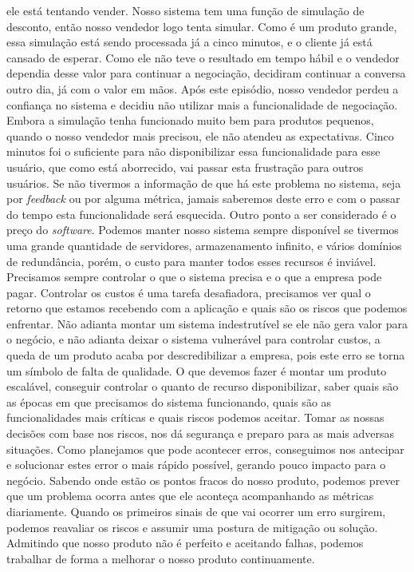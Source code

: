     ele está tentando vender. Nosso sistema tem uma função de simulação de desconto,
    então nosso vendedor logo tenta simular. Como é um produto grande, essa simulação
    está sendo processada já a cinco minutos, e o cliente já está cansado de esperar.
    Como ele não teve o resultado em tempo hábil e o vendedor dependia desse valor
    para continuar a negociação, decidiram continuar a conversa outro dia, já com
    o valor em mãos. Após este episódio, nosso vendedor perdeu a confiança no
    sistema e decidiu não utilizar mais a funcionalidade de negociação. Embora a
    simulação tenha funcionado muito bem para produtos pequenos, quando o nosso
    vendedor mais precisou, ele não atendeu as expectativas. Cinco minutos foi o
    suficiente para não disponibilizar essa funcionalidade para esse usuário, que
    como está aborrecido, vai passar esta frustração para outros usuários. Se não
    tivermos a informação de que há este problema no sistema, seja por \textit{feedback}
    ou por alguma métrica, jamais saberemos deste erro e com o passar do tempo esta
    funcionalidade será esquecida. \newline
    Outro ponto a ser considerado é o preço do \textit{software}. Podemos manter
    nosso sistema sempre disponível se tivermos uma grande quantidade de servidores,
    armazenamento infinito, e vários domínios de redundância, porém, o custo para manter
    todos esses recursos é inviável. Precisamos sempre controlar o que o sistema
    precisa e o que a empresa pode pagar. Controlar os custos é uma tarefa desafiadora,
    precisamos ver qual o retorno que estamos recebendo com a aplicação e quais
    são os riscos que podemos enfrentar. Não adianta montar um sistema indestrutível
    se ele não gera valor para o negócio, e não adianta deixar o sistema vulnerável
    para controlar custos, a queda de um produto acaba por descredibilizar a empresa,
    pois este erro se torna um símbolo de falta de qualidade. O que devemos fazer
    é montar um produto escalável, conseguir controlar o quanto de recurso disponibilizar,
    saber quais são as épocas em que precisamos do sistema funcionando, quais são
    as funcionalidades mais críticas e quais riscos podemos aceitar. Tomar as
    nossas decisões com base nos riscos, nos dá segurança e preparo para as mais
    adversas situações. Como planejamos que pode acontecer erros, conseguimos nos
    antecipar e solucionar estes error o mais rápido possível, gerando pouco impacto
    para o negócio. Sabendo onde estão os pontos fracos do nosso produto, podemos
    prever que um problema ocorra antes que ele aconteça acompanhando as métricas
    diariamente. Quando os primeiros sinais de que vai ocorrer um erro surgirem,
    podemos reavaliar os riscos e assumir uma postura de mitigação ou solução.
    Admitindo que nosso produto não é perfeito e aceitando falhas, podemos trabalhar
    de forma a melhorar o nosso produto continuamente.

